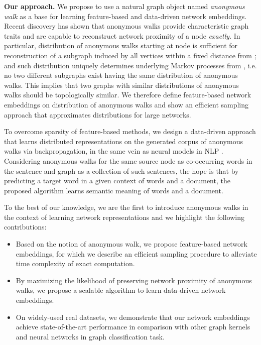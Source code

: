 \documentclass{article}
\theoremstyle{definition}
\begin{document}
\textbf{Our approach.} We propose to use a natural graph object named \textit{anonymous walk} as a base for learning feature-based and data-driven network embeddings. Recent discovery \cite{anonymouswalks} has shown that anonymous walks provide characteristic graph traits and are capable to reconstruct network proximity of a node \textit{exactly}. In particular, distribution of anonymous walks starting at node  is sufficient for reconstruction of a subgraph induced by all vertices within a fixed distance from ; and such distribution uniquely determines underlying Markov processes from , i.e. no two different subgraphs exist having the same distribution of anonymous walks. This implies that two graphs with similar distributions of anonymous walks should be topologically similar. We therefore define feature-based network embeddings on distribution of anonymous walks and show an efficient sampling approach that approximates distributions for large networks.  

To overcome sparsity of feature-based methods, we design a data-driven approach that learns distributed representations on the generated corpus of anonymous walks via backpropagation, in the same vein as neural models in NLP \cite{doc2vec, Bengio:2003}. Considering anonymous walks for the same source node as co-occurring words in the sentence and graph as a collection of such sentences, the hope is that by predicting a target word in a given context of words and a document, the proposed algorithm learns semantic meaning of words and a document. 

To the best of our knowledge, we are the first to introduce anonymous walks in the context of learning network representations and we highlight the following contributions: 





\begin{itemize}
\item Based on the notion of anonymous walk, we propose feature-based network embeddings, for which we describe an efficient sampling procedure to alleviate time complexity of exact computation.
\item By maximizing the likelihood of preserving network proximity of anonymous walks, we propose a scalable algorithm to learn data-driven network embeddings.
\item On widely-used real datasets, we demonstrate that our network embeddings achieve state-of-the-art performance in comparison with other graph kernels and neural networks in graph classification task. 
\end{itemize}
\end{document}
